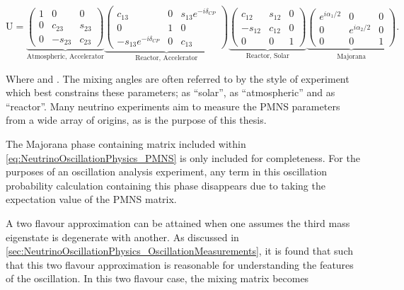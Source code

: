 \begin{equation}
  \label{eq:NeutrinoOscillationPhysics_PMNS}
  \mathrm{U} =
  \underbrace{\begin{pmatrix} 1 & 0 & 0 \\ 0 & c_{23} & s_{23} \\ 0 & -s_{23} & c_{23} \end{pmatrix}}_{\text{Atmospheric, Accelerator}}
  \underbrace{\begin{pmatrix} c_{13} & 0 & s_{13}e^{-i \delta_{CP}} \\ 0 & 1 & 0 \\ -s_{13}e^{-i \delta_{CP}} & 0 & c_{13} \end{pmatrix}}_{\text{Reactor, Accelerator}}
  \underbrace{\begin{pmatrix} c_{12} & s_{12} & 0 \\ -s_{12} & c_{12} & 0 \\ 0 & 0 & 1 \end{pmatrix}}_{\text{Reactor, Solar}}
  \underbrace{\begin{pmatrix} e^{i\alpha_{1}/2} & 0 & 0 \\ 0 & e^{i\alpha_{2}/2} & 0 \\ 0 & 0 & 1 \end{pmatrix}}_{\text{Majorana}}.
\end{equation}

Where  and . The mixing angles are often referred to by the style of experiment which best constrains these parameters;  as ``solar'',  as ``atmospheric'' and  as ``reactor''. Many neutrino experiments aim to measure the PMNS parameters from a wide array of origins, as is the purpose of this thesis.

The Majorana phase containing matrix included within \autoref{eq:NeutrinoOscillationPhysics_PMNS} is only included for completeness. For the purposes of an oscillation analysis experiment, any term in this oscillation probability calculation containing this phase disappears due to taking the expectation value of the PMNS matrix.

A two flavour approximation can be attained when one assumes the third mass eigenstate is degenerate with another. As discussed in \autoref{sec:NeutrinoOscillationPhysics_OscillationMeasurements}, it is found that  such that this two flavour approximation is reasonable for understanding the features of the oscillation. In this two flavour case, the mixing matrix becomes

